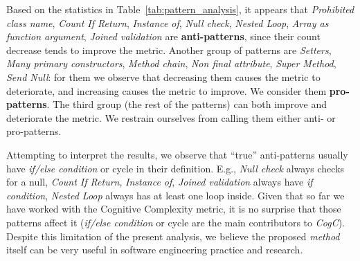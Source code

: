 \begin{table}[ht]
\end{table}

Based on the statistics in Table~\ref{tab:pattern_analysis}, it appears that \emph{Prohibited class name}, \emph{Count If Return}, \emph{Instance of}, \emph{Null check}, \emph{Nested Loop},
\emph{Array as function argument}, \emph{Joined validation} are \textbf{anti-patterns}, since their count decrease tends to improve the metric. Another group of patterns are \emph{Setters}, \emph{Many primary constructors}, \emph{Method chain}, \emph{Non final attribute}, \emph{Super Method}, \emph{Send Null}: for them we observe that decreasing them causes the metric to deteriorate, and increasing causes the metric to improve. We consider them \textbf{pro-patterns}. The third group (the rest of the patterns) can both improve and deteriorate the metric. We restrain ourselves from calling them either anti- or pro-patterns.

Attempting to interpret the results, we observe that ``true'' anti-patterns usually have \emph{if/else condition} or cycle in their definition.
E.g., \emph{Null check} always checks for a null, \emph{Count If Return}, \emph{Instance of},
\emph{Joined validation} always have \emph{if condition}, \emph{Nested Loop} always has at least one loop inside. Given that so far we have worked with the Cognitive Complexity metric, it is no surprise that those patterns affect it (\emph{if/else condition} or cycle are the main contributors to \emph{CogC}). Despite this limitation of the present analysis, we believe the proposed \textit{method} itself can be very useful in software engineering practice and research.




